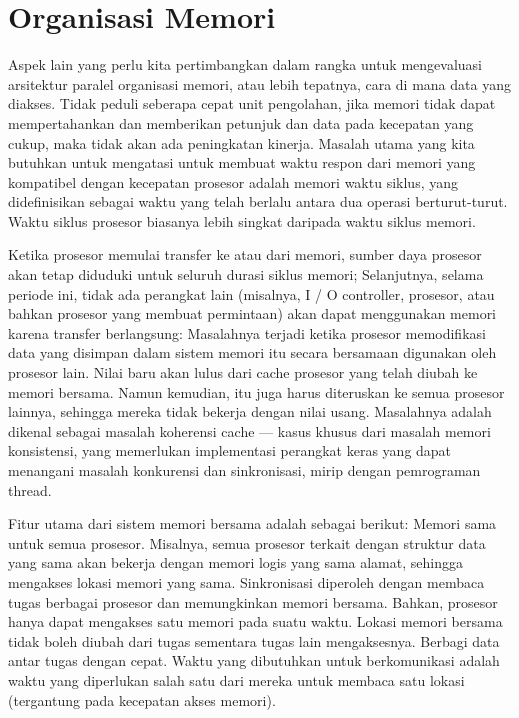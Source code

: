 \section{Organisasi Memori}
Aspek lain yang perlu kita pertimbangkan dalam rangka untuk mengevaluasi arsitektur paralel organisasi memori, atau lebih tepatnya, cara di mana data yang diakses. Tidak peduli seberapa cepat unit pengolahan, jika memori tidak dapat mempertahankan dan memberikan petunjuk dan data pada kecepatan yang cukup, maka tidak akan ada peningkatan kinerja. Masalah utama yang kita butuhkan untuk mengatasi untuk membuat waktu respon dari memori yang kompatibel dengan kecepatan prosesor adalah memori waktu siklus, yang didefinisikan sebagai waktu yang telah berlalu antara dua operasi berturut-turut. Waktu siklus prosesor biasanya lebih singkat daripada waktu siklus memori.

Ketika prosesor memulai transfer ke atau dari memori, sumber daya prosesor akan tetap diduduki untuk seluruh durasi siklus memori; Selanjutnya, selama periode ini, tidak ada perangkat lain (misalnya, I / O controller, prosesor, atau bahkan prosesor yang membuat permintaan) akan dapat menggunakan memori karena transfer berlangsung:
Masalahnya terjadi ketika prosesor memodifikasi data yang disimpan dalam sistem memori itu secara bersamaan digunakan oleh prosesor lain. Nilai baru akan lulus dari cache prosesor yang telah diubah ke memori bersama. Namun kemudian, itu juga harus diteruskan ke semua prosesor lainnya, sehingga mereka tidak bekerja dengan nilai usang. Masalahnya adalah dikenal sebagai masalah koherensi cache — kasus khusus dari masalah memori konsistensi, yang memerlukan implementasi perangkat keras yang dapat menangani masalah konkurensi dan sinkronisasi, mirip dengan pemrograman thread.

Fitur utama dari sistem memori bersama adalah sebagai berikut: Memori sama untuk semua prosesor. Misalnya, semua prosesor terkait dengan struktur data yang sama akan bekerja dengan memori logis yang sama alamat, sehingga mengakses lokasi memori yang sama. Sinkronisasi diperoleh dengan membaca tugas berbagai prosesor dan memungkinkan memori bersama. Bahkan, prosesor hanya dapat mengakses satu memori pada suatu waktu. Lokasi memori bersama tidak boleh diubah dari tugas sementara tugas lain mengaksesnya. Berbagi data antar tugas dengan cepat. Waktu yang dibutuhkan untuk berkomunikasi adalah waktu yang diperlukan salah satu dari mereka untuk membaca satu lokasi (tergantung pada kecepatan akses memori).

